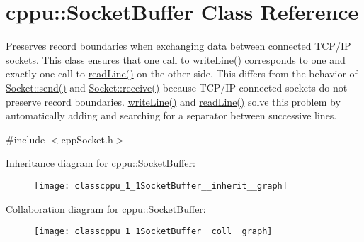 \hypertarget{classcppu_1_1SocketBuffer}{}\section{cppu\+:\+:Socket\+Buffer Class Reference}
\label{classcppu_1_1SocketBuffer}


Preserves record boundaries when exchanging data between connected T\+C\+P/\+I\+P sockets. This class ensures that one call to \hyperlink{classcppu_1_1SocketBuffer_a92ae0351aaee8719d34e8c4618495d59}{write\+Line()} corresponds to one and exactly one call to \hyperlink{classcppu_1_1SocketBuffer_a222769d3776b9cbd3a727ee1f0e60358}{read\+Line()} on the other side. This differs from the behavior of \hyperlink{classcppu_1_1Socket_aeac77f859159715e2d63a5a0dc118788}{Socket\+::send()} and \hyperlink{classcppu_1_1Socket_a37c382af52cc02f92c0e19a0c6e0e04f}{Socket\+::receive()} because T\+C\+P/\+I\+P connected sockets do not preserve record boundaries. \hyperlink{classcppu_1_1SocketBuffer_a92ae0351aaee8719d34e8c4618495d59}{write\+Line()} and \hyperlink{classcppu_1_1SocketBuffer_a222769d3776b9cbd3a727ee1f0e60358}{read\+Line()} solve this problem by automatically adding and searching for a separator between successive lines.  




{\ttfamily \#include $<$cpp\+Socket.\+h$>$}



Inheritance diagram for cppu\+:\+:Socket\+Buffer\+:
\nopagebreak
\begin{figure}[H]
\begin{center}
\leavevmode
\texttt{[image: classcppu\_1\_1SocketBuffer\_\_inherit\_\_graph]}
\end{center}
\end{figure}


Collaboration diagram for cppu\+:\+:Socket\+Buffer\+:
\nopagebreak
\begin{figure}[H]
\begin{center}
\leavevmode
\texttt{[image: classcppu\_1\_1SocketBuffer\_\_coll\_\_graph]}
\end{center}
\end{figure}

